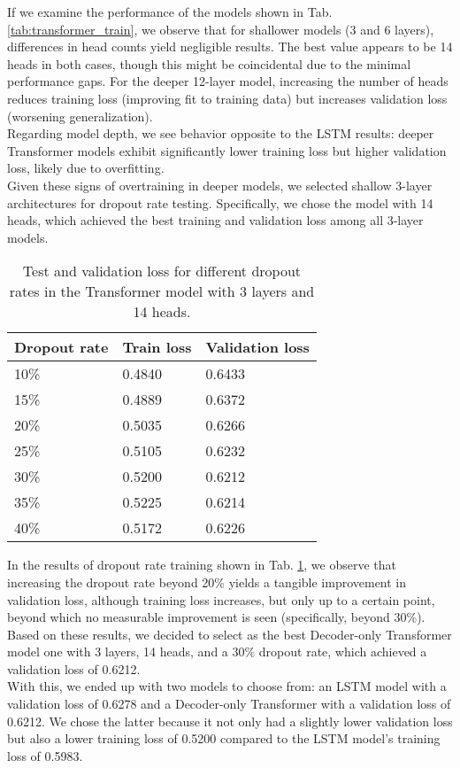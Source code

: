 If we examine the performance of the models shown in Tab. \ref{tab:transformer_train}, we observe that for shallower models (3 and 6 layers), differences in head counts yield negligible results. The best value appears to be 14 heads in both cases, though this might be coincidental due to the minimal performance gaps. For the deeper 12-layer model, increasing the number of heads reduces training loss (improving fit to training data) but increases validation loss (worsening generalization).
\\

Regarding model depth, we see behavior opposite to the LSTM results: deeper Transformer models exhibit significantly lower training loss but higher validation loss, likely due to overfitting.
\\

Given these signs of overtraining in deeper models, we selected shallow 3-layer architectures for dropout rate testing. Specifically, we chose the model with 14 heads, which achieved the best training and validation loss among all 3-layer models.
\\

\begin{table}[!h]
	\centering
	\begin{tabular}{|l|l|l|}
		\hline
		Dropout rate & Train loss & Validation loss \\ \hline
		10\%         & 0.4840    & 0.6433                \\ \hline
		15\%         & 0.4889    & 0.6372                \\ \hline
		20\%         & 0.5035    & 0.6266                \\ \hline
		25\%         & 0.5105    & 0.6232                \\ \hline
		30\%         & 0.5200    & 0.6212                \\ \hline 
		35\%         & 0.5225    & 0.6214                \\ \hline
		40\%         & 0.5172    & 0.6226                \\ \hline 
	\end{tabular}
	\caption{Test and validation loss for different dropout rates in the Transformer model with 3 layers and 14 heads.}
	\label{tab:transformer_dropout}
\end{table}

In the results of dropout rate training shown in Tab. \ref{tab:transformer_dropout}, we observe that increasing the dropout rate beyond 20\% yields a tangible improvement in validation loss, although training loss increases, but only up to a certain point, beyond which no measurable improvement is seen (specifically, beyond 30\%). Based on these results, we decided to select as the best Decoder-only Transformer model one with 3 layers, 14 heads, and a 30\% dropout rate, which achieved a validation loss of 0.6212.
\\

With this, we ended up with two models to choose from: an LSTM model with a validation loss of 0.6278 and a Decoder-only Transformer with a validation loss of 0.6212. We chose the latter because it not only had a slightly lower validation loss but also a lower training loss of 0.5200 compared to the LSTM model's training loss of 0.5983.
